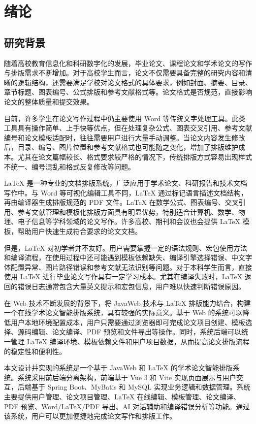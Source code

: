 \documentclass{xduugthesis}
\begin{document}
\chapter{绪论}

\section{研究背景}

随着高校教育信息化和科研数字化的发展，毕业论文、课程论文和学术论文的写作与排版需求不断增加。对于高校学生而言，论文不仅需要具备完整的研究内容和清晰的逻辑结构，还需要满足学校对论文格式的具体要求，例如封面、摘要、目录、章节标题、图表编号、公式排版和参考文献格式等。论文格式是否规范，直接影响论文的整体质量和提交效果。

目前，许多学生在论文写作过程中仍主要使用 Word 等传统文字处理工具。此类工具具有操作简单、上手快等优点，但在处理复杂公式、图表交叉引用、参考文献编号和论文模板适配时，往往需要用户进行大量手动调整\cite{gong2009automating}。当论文内容发生修改后，目录、编号、图片位置和参考文献格式也可能随之变化，增加了排版维护成本。尤其在论文篇幅较长、格式要求较严格的情况下，传统排版方式容易出现样式不统一、编号混乱和格式反复修改等问题。

LaTeX 是一种专业的文档排版系统，广泛应用于学术论文、科研报告和技术文档写作中\cite{zhou2022latex}。与 Word 等可视化编辑工具不同，LaTeX 通过标记语言描述文档结构，再由编译器生成排版规范的 PDF 文件。LaTeX 在数学公式、图表编号、交叉引用、参考文献管理和模板化排版方面具有明显优势，特别适合计算机、数学、物理、电子信息等学科领域的论文写作\cite{tan2023latex}。许多高校、期刊和会议也会提供 LaTeX 模板，帮助用户快速生成符合要求的论文文档。

但是，LaTeX 对初学者并不友好。用户需要掌握一定的语法规则、宏包使用方法和编译流程，在使用过程中还可能遇到模板依赖缺失、编译引擎选择错误、中文字体配置异常、图片路径错误和参考文献无法识别等问题\cite{wang2019latex}。对于本科学生而言，直接使用 LaTeX 进行毕业论文写作具有一定学习成本。尤其在编译失败时，LaTeX 返回的错误日志通常包含大量英文提示和宏包信息，用户难以快速判断错误原因。

在 Web 技术不断发展的背景下，将 JavaWeb 技术与 LaTeX 排版能力结合，构建一个在线学术论文智能排版系统，具有较强的实际意义\cite{li2025javaweb}。基于 Web 的系统可以降低用户本地环境配置成本，用户只需要通过浏览器即可完成论文项目创建、模板选择、源码编辑、论文编译、PDF 预览和文件导出等操作。同时，系统后端可以统一管理 LaTeX 编译环境、模板依赖文件和用户项目数据，从而提高论文排版流程的稳定性和便利性。

本文设计并实现的系统是一个基于 JavaWeb 和 LaTeX 的学术论文智能排版系统。系统采用前后端分离架构，前端基于 Vue 3 和 Vite 实现页面展示与用户交互，后端基于 Spring Boot、MyBatis 和 MySQL 实现业务逻辑和数据管理。系统主要提供用户管理、论文项目管理、LaTeX 在线编辑、模板管理、论文编译、PDF 预览、Word/LaTeX/PDF 导出、AI 对话辅助和编译错误分析等功能。通过该系统，用户可以更加便捷地完成论文写作和排版工作。
\end{document}
